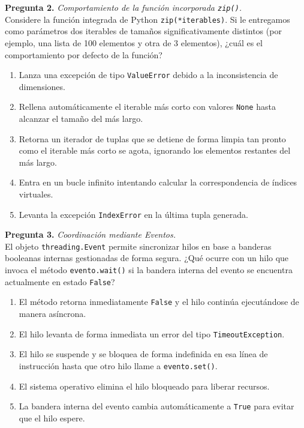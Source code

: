 \documentclass[12pt,letterpaper]{article}
\begin{document}
\textbf{Pregunta 2.} \textit{Comportamiento de la función incorporada \texttt{zip()}.} \\
Considere la función integrada de Python \texttt{zip(*iterables)}. Si le entregamos como parámetros dos iterables de tamaños significativamente distintos (por ejemplo, una lista de 100 elementos y otra de 3 elementos), ¿cuál es el comportamiento por defecto de la función?
\begin{enumerate}[label=\alph*)]
  \item Lanza una excepción de tipo \texttt{ValueError} debido a la inconsistencia de dimensiones.
  \item Rellena automáticamente el iterable más corto con valores \texttt{None} hasta alcanzar el tamaño del más largo.
  \item Retorna un iterador de tuplas que se detiene de forma limpia tan pronto como el iterable más corto se agota, ignorando los elementos restantes del más largo.
  \item Entra en un bucle infinito intentando calcular la correspondencia de índices virtuales.
  \item Levanta la excepción \texttt{IndexError} en la última tupla generada.
\end{enumerate}

\bigskip

\textbf{Pregunta 3.} \textit{Coordinación mediante Eventos.} \\
El objeto \texttt{threading.Event} permite sincronizar hilos en base a banderas booleanas internas gestionadas de forma segura. ¿Qué ocurre con un hilo que invoca el método \texttt{evento.wait()} si la bandera interna del evento se encuentra actualmente en estado \texttt{False}?
\begin{enumerate}[label=\alph*)]
  \item El método retorna inmediatamente \texttt{False} y el hilo continúa ejecutándose de manera asíncrona.
  \item El hilo levanta de forma inmediata un error del tipo \texttt{TimeoutException}.
  \item El hilo se suspende y se bloquea de forma indefinida en esa línea de instrucción hasta que otro hilo llame a \texttt{evento.set()}.
  \item El sistema operativo elimina el hilo bloqueado para liberar recursos.
  \item La bandera interna del evento cambia automáticamente a \texttt{True} para evitar que el hilo espere.
\end{enumerate}
\end{document}
